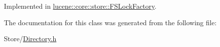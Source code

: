 Implemented in \mbox{\hyperlink{classlucene_1_1core_1_1store_1_1FSLockFactory_a27bb42e846edf5f69913b78ccdf3208e}{lucene\+::core\+::store\+::\+F\+S\+Lock\+Factory}}.



The documentation for this class was generated from the following file\+:\begin{DoxyCompactItemize}
\item 
Store/\mbox{\hyperlink{Directory_8h}{Directory.\+h}}\end{DoxyCompactItemize}

